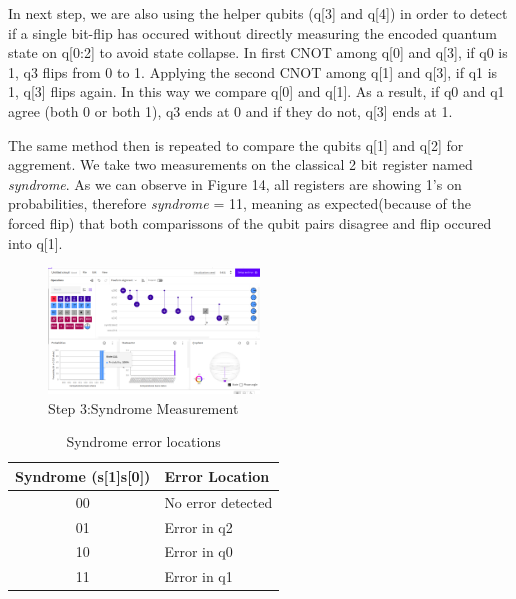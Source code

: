 \documentclass[12pt]{ieeetj}
\begin{document}
		In next step, we are also using the helper qubits (q[3] and q[4]) in order to detect if a 
		single bit-flip has occured without directly measuring the encoded quantum state on q[0:2] to avoid 
		state collapse.
		In first CNOT among q[0] and q[3], if q0 is 1,
		q3 flips from 0 to 1. Applying the second CNOT among q[1] and q[3], 
		if q1 is 1, q[3] flips again. In this way we compare q[0] and q[1].
		As a result, if q0 and q1 agree (both 0 or both 1), 
		q3 ends at 0 and if they do not, q[3] ends at 1.

		The same method then is repeated to compare the qubits q[1] and q[2] for aggrement.
		We take two measurements on the classical 2 bit register named \textit{syndrome}.
		As we can observe in Figure 14, all registers are showing 1's on probabilities, therefore
		\textit{syndrome} = 11, meaning as expected(because of the forced flip) 
		that both comparissons of the qubit pairs disagree and flip occured into q[1].

		\begin{figure}[H]
			\centering
			\includegraphics[width=0.5\textwidth]{ibmq/step_c.png}
			\caption{Step 3:Syndrome Measurement}
			\label{fig14:}
		\end{figure}		


		\begin{table}[ht]
		\centering
		\caption{Syndrome error locations}
		\label{tab:syndrome}
		\begin{tabular}{|c|l|}
		\hline
		\textbf{Syndrome (s[1]s[0])} & \textbf{Error Location} \\ 
		\hline
		00 & No error detected \\
		01 & Error in q2 \\
		10 & Error in q0 \\
		11 & Error in q1 \\
		\hline
		\end{tabular}
		\end{table}	
\end{document}
